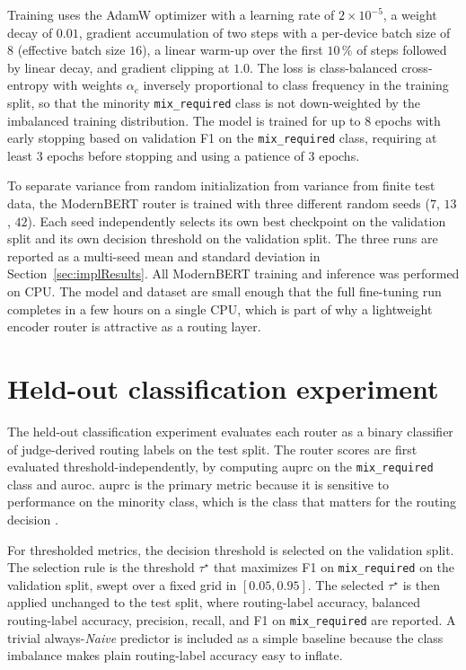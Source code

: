 \documentclass[english, bibtex]{kththesis}               %
\numberwithin{listing}{chapter}
\begin{document}
Training uses the AdamW optimizer \cite{loshchilov2019decoupled} with a learning rate of $2 \times 10^{-5}$, a weight decay of $0.01$, gradient accumulation of two steps with a per-device batch size of $8$ (effective batch size $16$), a linear warm-up over the first $10\,\%$ of steps followed by linear decay, and gradient clipping at $1.0$. The loss is class-balanced cross-entropy with weights $\alpha_c$ inversely proportional to class frequency in the training split, so that the minority \texttt{mix\_required} class is not down-weighted by the imbalanced training distribution. The model is trained for up to $8$ epochs with early stopping based on validation F1 on the \texttt{mix\_required} class, requiring at least $3$ epochs before stopping and using a patience of $3$ epochs.

To separate variance from random initialization from variance from finite test data, the ModernBERT router is trained with three different random seeds ($7$, $13$, $42$). Each seed independently selects its own best checkpoint on the validation split and its own decision threshold on the validation split. The three runs are reported as a multi-seed mean and standard deviation in Section~\ref{sec:implResults}. All ModernBERT training and inference was performed on CPU. The model and dataset are small enough that the full fine-tuning run completes in a few hours on a single CPU, which is part of why a lightweight encoder router is attractive as a routing layer.

\section{Held-out classification experiment}
\label{sec:implClassification}

The held-out classification experiment evaluates each router as a binary classifier of judge-derived routing labels on the test split. The router scores are first evaluated threshold-independently, by computing \gls{auprc} on the \texttt{mix\_required} class and \gls{auroc}. \Gls{auprc} is the primary metric because it is sensitive to performance on the minority class, which is the class that matters for the routing decision \cite{saito2015precision}.

For thresholded metrics, the decision threshold is selected on the validation split. The selection rule is the threshold $\tau^\star$ that maximizes F1 on \texttt{mix\_required} on the validation split, swept over a fixed grid in $[0.05, 0.95]$. The selected $\tau^\star$ is then applied unchanged to the test split, where routing-label accuracy, balanced routing-label accuracy, precision, recall, and F1 on \texttt{mix\_required} are reported. A trivial always-\emph{Naive} predictor is included as a simple baseline because the class imbalance makes plain routing-label accuracy easy to inflate.
\end{document}
